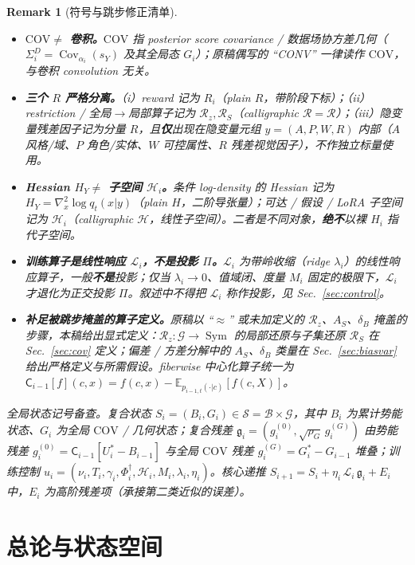 \documentclass[11pt,a4paper]{article}
\newtheorem{remark}[theorem]{Remark}
\DeclareMathOperator{\Cov}{Cov}
\newcommand{\E}{\mathbb{E}}
\newcommand{\cH}{\mathcal{H}}   %
\newcommand{\cL}{\mathcal{L}}   %
\newcommand{\cS}{\mathcal{S}}   %
\newcommand{\cG}{\mathcal{G}}   %
\newcommand{\cB}{\mathcal{B}}   %
\newcommand{\Rstr}{\mathcal{R}}     %
\newcommand{\Center}{\mathsf{C}}    %
\newcommand{\ProjectOp}{\Pi}        %
\newcommand{\COV}{\mathrm{COV}}     %
\newcommand{\gres}{\bm{\mathfrak{g}}} %
\newcommand{\Sym}{\operatorname{Sym}}
\begin{document}
\begin{remark}[符号与跳步修正清单]\label{s0:rmk:fixes}
\begin{itemize}[leftmargin=*]
\item \textbf{$\COV\ne$ 卷积。}$\COV$ 指 posterior score covariance / 数据场协方差几何（$\Sigma_i^D=\Cov_{\alpha_i}(s_Y)$ 及其全局态 $G_i$）；原稿偶写的 “CONV” 一律读作 $\COV$，与卷积 convolution 无关。
\item \textbf{三个 $R$ 严格分离。}（i）reward 记为 $R_i$（plain $R$，带阶段下标）；（ii）restriction / 全局$\to$局部算子记为 $\Rstr_z,\Rstr_S$（calligraphic $\Rstr=\mathcal R$）；（iii）隐变量残差因子记为分量 $R$，且\textbf{仅}出现在隐变量元组 $y=(A,P,W,R)$ 内部（$A$ 风格/域、$P$ 角色/实体、$W$ 可控属性、$R$ 残差视觉因子），不作独立标量使用。
\item \textbf{Hessian $H_Y\ne$ 子空间 $\cH_i$。}条件 log-density 的 Hessian 记为 $H_Y=\nabla_x^2\log q_t(x|y)$（plain $H$，二阶导张量）；可达 / 假设 / LoRA 子空间记为 $\cH_i$（calligraphic $\cH$，线性子空间）。二者是不同对象，\textbf{绝不}以裸 $H_i$ 指代子空间。
\item \textbf{训练算子是线性响应 $\cL_i$，不是投影 $\ProjectOp$。}$\cL_i$ 为带岭收缩（ridge $\lambda_i$）的\emph{线性响应算子}，一般\textbf{不是}投影；仅当 $\lambda_i\to 0$、值域闭、度量 $M_i$ 固定的极限下，$\cL_i$ 才退化为正交投影 $\ProjectOp$。叙述中不得把 $\cL_i$ 称作投影，见 Sec.~\ref{sec:control}。
\item \textbf{补足被跳步掩盖的算子定义。}原稿以 “$\approx$” 或未加定义的 $\Rstr_z$、$A_S$、$\delta_B$ 掩盖的步骤，本稿给出显式定义：$\Rstr_z:\cG\to\Sym$ 的局部还原与子集还原 $\Rstr_S$ 在 Sec.~\ref{sec:cov} 定义；偏差 / 方差分解中的 $A_S$、$\delta_B$ 类量在 Sec.~\ref{sec:biasvar} 给出严格定义与所需假设。fiberwise 中心化算子统一为 $\Center_{i-1}[f](c,x)=f(c,x)-\E_{p_{i-1,t}(\cdot|c)}[f(c,X)]$。
\end{itemize}

\noindent\emph{全局状态记号备查。}复合状态 $S_i=(B_i,G_i)\in\cS=\cB\times\cG$，其中 $B_i$ 为累计势能状态、$G_i$ 为全局 $\COV$ / 几何状态；复合残差 $\gres_i=(g_i^{(0)},\sqrt{\rho_G}\,g_i^{(G)})$ 由势能残差 $g_i^{(0)}=\Center_{i-1}[U_i^*-B_{i-1}]$ 与全局 $\COV$ 残差 $g_i^{(G)}=G_i^*-G_{i-1}$ 堆叠；训练控制 $u_i=(\nu_i,T_i,\gamma_i,\Phi_i^\dagger,\cH_i,M_i,\lambda_i,\eta_i)$。核心递推 $S_{i+1}=S_i+\eta_i\,\cL_i\,\gres_i+E_i$ 中，$E_i$ 为高阶残差项（承接第二类近似的误差）。
\end{remark}

\section{总论与状态空间}\label{sec:state}
\end{document}
